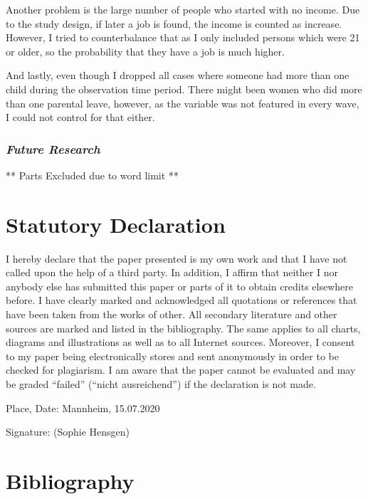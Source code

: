 \documentclass[
  11pt,
]{article}
\begin{document}
Another problem is the large number of people who started with no income. Due to the study design, if later a job is found, the income is counted as increase.\\
However, I tried to counterbalance that as I only included persons which were 21 or older, so the probability that they have a job is much higher.

And lastly, even though I dropped all cases where someone had more than one child during the observation time period. There might been women who did more than one parental leave, however, as the variable was not featured in every wave, I could not control for that either.

\hypertarget{future-research}{%
\subsubsection*{\texorpdfstring{\emph{Future Research}}{Future Research}}\label{future-research}}

** Parts Excluded due to word limit **

\hypertarget{statutory-declaration}{%
\section*{Statutory Declaration}\label{statutory-declaration}}

I hereby declare that the paper presented is my own work and that I have not called upon the help of a third party. In addition, I affirm that neither I nor anybody else has submitted this paper or parts of it to obtain credits elsewhere before. I have clearly marked and acknowledged all quotations or references that have been taken from the works of other. All secondary literature and other sources are marked and listed in the bibliography. The same applies to all charts, diagrams and illustrations as well as to all Internet sources. Moreover, I consent to my paper being electronically stores and sent anonymously in order to be checked for plagiarism. I am aware that the paper cannot be evaluated and may be graded ``failed'' (``nicht ausreichend'') if the declaration is not made.

Place, Date: Mannheim, 15.07.2020

Signature:
(Sophie Hensgen)

\newpage

\hypertarget{bibliography}{%
\section*{Bibliography}\label{bibliography}}
\end{document}
